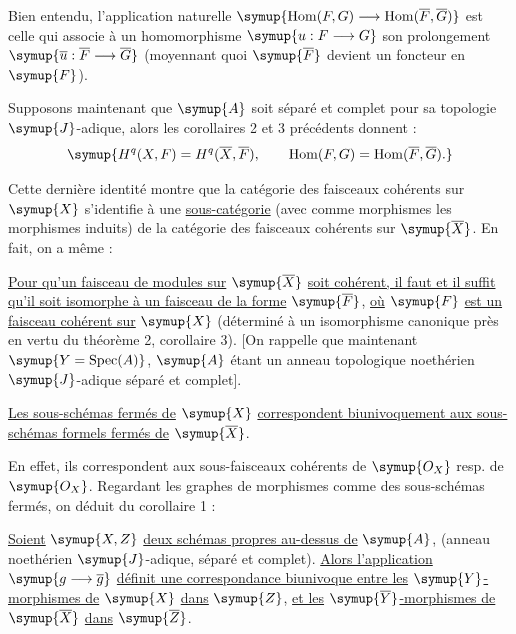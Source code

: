 Bien entendu, l'application naturelle
$\symup{\operatorname{Hom}(F,G)\longrightarrow
\operatorname{Hom}(\overline F,\overline G)}$ est celle qui associe à un
homomorphisme $\symup{u:F\longrightarrow G}$ son prolongement 
$\symup{\overline u:\overline F\longrightarrow\overline G}$ (moyennant quoi
$\symup{\overline F}$ devient un foncteur en $\symup{F}$).

Supposons maintenant que $\symup{A}$ soit séparé et complet pour sa topologie
$\symup{J}$-adique, alors les corollaires 2 et 3 précédents donnent :
\[
  \symup{H^{q}(X,F)=H^{q}(\overline X,\overline F),
  \qquad
  \operatorname{Hom}(F,G)
  =\operatorname{Hom}(\overline F,\overline G).}
\]

Cette dernière identité montre que la catégorie des faisceaux cohérents sur
$\symup{X}$ s'identifie à une \uline{sous-catégorie} (avec comme morphismes les
morphismes induits) de la catégorie des faisceaux cohérents sur $\symup{\overline X}$.
En fait, on a même :

 \uline{Pour qu'un faisceau de modules sur} $\symup{\overline X}$ \uline{soit
cohérent, il faut et il suffit qu'il soit isomorphe à un faisceau de la forme}
$\symup{\overline F}$, \uline{où} $\symup{F}$ \uline{est un faisceau cohérent sur} $\symup{X}$ (déterminé à un
isomorphisme canonique près en vertu du théorème 2, corollaire 3). [On rappelle
que maintenant $\symup{Y=\operatorname{Spec}(A)}$, $\symup{A}$ étant un anneau topologique
noethérien $\symup{J}$-adique séparé et complet].

 \uline{Les sous-schémas fermés de} $\symup{X}$ \uline{correspondent
biunivoquement aux sous-schémas formels fermés de} $\symup{\overline X}$.

En effet, ils correspondent aux sous-faisceaux cohérents de $\symup{O_X}$ resp. de
$\symup{O_X}$. Regardant les graphes de morphismes comme des sous-schémas
fermés, on déduit du corollaire 1 :

 \uline{Soient} $\symup{X,Z}$ \uline{deux schémas propres au-dessus de} $\symup{A}$,
(anneau noethérien $\symup{J}$-adique, séparé et complet). \uline{Alors l'application}
$\symup{g\longrightarrow\overline g}$ \uline{définit une correspondance biunivoque entre les}
$\symup{Y}$\uline{-morphismes de} $\symup{X}$ \uline{dans} $\symup{Z}$, \uline{et les} $\symup{\overline Y}$\uline{-morphismes de}
$\symup{\overline X}$ \uline{dans} $\symup{\overline Z}$.

